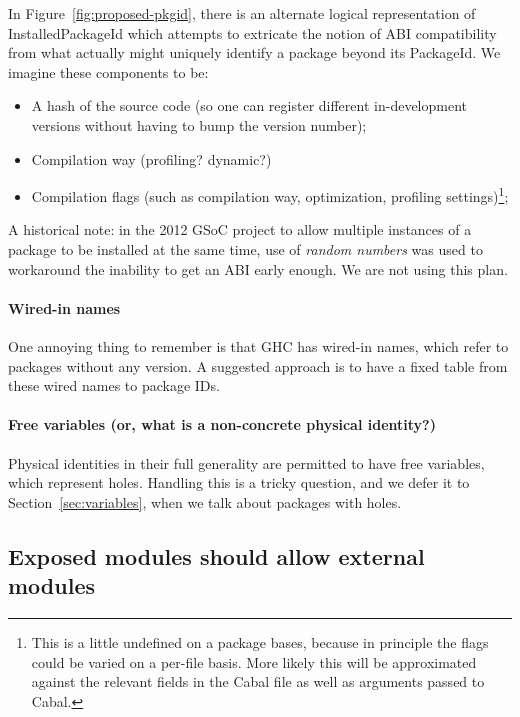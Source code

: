 \documentclass{article}
\begin{document}
In Figure~\ref{fig:proposed-pkgid}, there is an alternate logical
representation of InstalledPackageId which attempts to extricate the
notion of ABI compatibility from what actually might uniquely identify a
package beyond its PackageId.  We imagine these components to be:

\begin{itemize}
    \item A hash of the source code (so one can register different
        in-development versions without having to bump the version
        number);
    \item Compilation way (profiling? dynamic?)
    \item Compilation flags (such as compilation way, optimization,
        profiling settings)\footnote{This is a little undefined on a package bases, because in principle the flags could be varied on a per-file basis. More likely this will be approximated against the relevant fields in the Cabal file as well as arguments passed to Cabal.};
\end{itemize}

A historical note: in the 2012 GSoC project to allow multiple instances
of a package to be installed at the same time, use of \emph{random
numbers} was used to workaround the inability to get an ABI early
enough.  We are not using this plan.

\paragraph{Wired-in names} One annoying thing to remember is that GHC
has wired-in names, which refer to packages without any version.  A
suggested approach is to have a fixed table from these wired names to
package IDs.

\paragraph{Free variables (or, what is a non-concrete physical
identity?)} Physical identities in their full generality are permitted
to have free variables, which represent holes.  Handling this is a
tricky question, and we defer it to Section~\ref{sec:variables}, when
we talk about packages with holes.

\subsection{Exposed modules should allow external modules}\label{sec:reexport}
\end{document}
